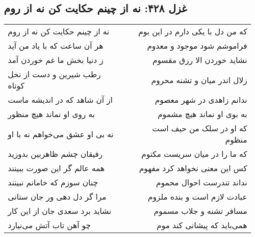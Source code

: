 \begin{center}
\section*{غزل ۴۲۸: نه از چینم حکایت کن نه از روم}
\label{sec:428}
\begin{longtable}{l p{0.5cm} r}
نه از چینم حکایت کن نه از روم
&&
که من دل با یکی دارم در این بوم
\\
هر آن ساعت که با یاد من آید
&&
فراموشم شود موجود و معدوم
\\
ز دنیا بخش ما غم خوردن آمد
&&
نشاید خوردن الا رزق مقسوم
\\
رطب شیرین و دست از نخل کوتاه
&&
زلال اندر میان و تشنه محروم
\\
از آن شاهد که در اندیشه ماست
&&
ندانم زاهدی در شهر معصوم
\\
به روی او نماند هیچ منظور
&&
به بوی او نماند هیچ مشموم
\\
نه بی او عشق می‌خواهم نه با او
&&
که او در سلک من حیف است منظوم
\\
رفیقان چشم ظاهربین بدوزید
&&
که ما را در میان سریست مکتوم
\\
همه عالم گر این صورت ببینند
&&
کس این معنی نخواهد کرد مفهوم
\\
چنان سوزم که خامانم نبینند
&&
نداند تندرست احوال محموم
\\
مرا گر دل دهی ور جان ستانی
&&
عبادت لازم است و بنده ملزوم
\\
نشاید برد سعدی جان از این کار
&&
مسافر تشنه و جلاب مسموم
\\
چو آهن تاب آتش می‌نیارد
&&
همی‌باید که پیشانی کند موم
\\
\end{longtable}
\end{center}
